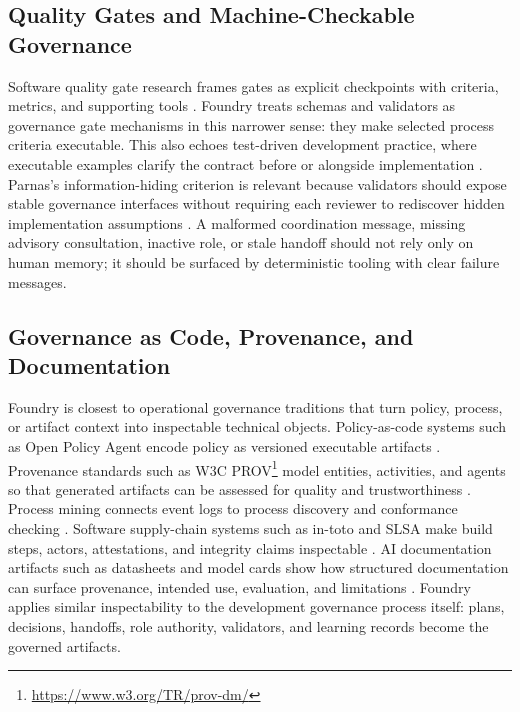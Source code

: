 \documentclass[conference]{IEEEtran}
\begin{document}
\subsection{Quality Gates and Machine-Checkable Governance}

Software quality gate research frames gates as explicit checkpoints with criteria, metrics, and supporting tools \cite{uzunova2024quality}. Foundry treats schemas and validators as governance gate mechanisms in this narrower sense: they make selected process criteria executable. This also echoes test-driven development practice, where executable examples clarify the contract before or alongside implementation \cite{beck2002tdd}. Parnas's information-hiding criterion is relevant because validators should expose stable governance interfaces without requiring each reviewer to rediscover hidden implementation assumptions \cite{parnas1972criteria}. A malformed coordination message, missing advisory consultation, inactive role, or stale handoff should not rely only on human memory; it should be surfaced by deterministic tooling with clear failure messages.

\subsection{Governance as Code, Provenance, and Documentation}

Foundry is closest to operational governance traditions that turn policy, process, or artifact context into inspectable technical objects. Policy-as-code systems such as Open Policy Agent encode policy as versioned executable artifacts \cite{openpolicyagent2026}. Provenance standards such as W3C PROV\footnote{\url{https://www.w3.org/TR/prov-dm/}} model entities, activities, and agents so that generated artifacts can be assessed for quality and trustworthiness \cite{moreau2013provdm}. Process mining connects event logs to process discovery and conformance checking \cite{vanderAalst2012manifesto}. Software supply-chain systems such as in-toto and SLSA make build steps, actors, attestations, and integrity claims inspectable \cite{torresarias2019intoto,slsa2026}. AI documentation artifacts such as datasheets and model cards show how structured documentation can surface provenance, intended use, evaluation, and limitations \cite{gebru2021datasheets,mitchell2019modelcards}. Foundry applies similar inspectability to the development governance process itself: plans, decisions, handoffs, role authority, validators, and learning records become the governed artifacts.
\end{document}
